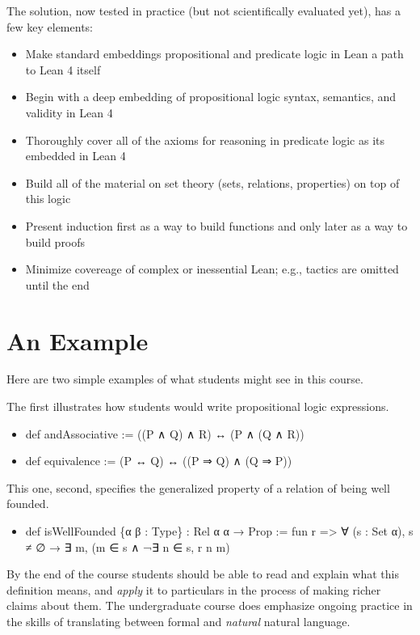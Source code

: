 \documentclass{book}
\providecommand{\tightlist}{%
  \setlength{\itemsep}{0pt}\setlength{\parskip}{0pt}}
\begin{document}
The solution, now tested in practice (but not scientifically evaluated yet), has a few
key elements:

\begin{itemize}
\tightlist
\item
  Make standard embeddings propositional and predicate logic in Lean a path to Lean 4 itself
\item
  Begin with a deep embedding of propositional logic syntax, semantics, and validity in Lean 4
\item
  Thoroughly cover all of the axioms for reasoning in predicate logic as its embedded in Lean 4
\item
  Build all of the material on set theory (sets, relations, properties) on top of this logic
\item
  Present induction first as a way to build functions and only later as a way to build proofs
\item
  Minimize covereage of complex or inessential Lean; e.g., tactics are omitted until the end
\end{itemize}

\hypertarget{pandoc.profile.debug__pandoc__debug__src__preface.md__an-example}{%
\section*{An Example}\label{pandoc.profile.debug__pandoc__debug__src__preface.md__an-example}}

Here are two simple examples of what students might see in this course.

The first  illustrates how students would write propositional logic expressions.

\begin{itemize}
\tightlist
\item
  def andAssociative  := ((P ∧ Q) ∧ R) ↔ (P ∧ (Q ∧ R))
\item
  def equivalence     := (P ↔ Q) ↔ ((P ⇒ Q) ∧ (Q ⇒ P))
\end{itemize}

This one, second, specifies the generalized property of a relation of being well founded.

\begin{itemize}
\tightlist
\item
  def isWellFounded  \{α  β : Type\} : Rel α α → Prop := fun r =\textgreater{} ∀ (s : Set α), s ≠ ∅ → ∃ m, (m ∈ s ∧ ¬∃ n ∈ s, r n m)
\end{itemize}

By the end of the course students should be able to read and explain what this definition
means, and \emph{apply} it to particulars in the process of making richer claims about them.
The undergraduate course does emphasize ongoing practice in the skills of translating between
formal and \emph{natural} natural language.
\end{document}
